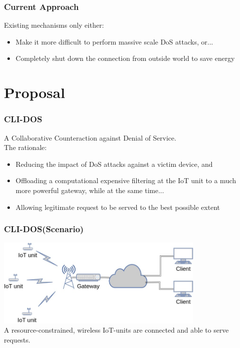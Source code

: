 \documentclass{beamer}
\begin{document}
\begin{frame}
\frametitle{Current Approach}
Existing mechanisms only either:
\begin{itemize}
    \item<1-> Make it more difficult to perform massive scale DoS attacks, or...
    \item<2-> Completely shut down the connection from outside world to save energy
\end{itemize}
\end{frame}


\section{Proposal}

\begin{frame}
\frametitle{CLI-DOS}
A Collaborative Counteraction against Denial of Service. \pause \\
The rationale:
\begin{itemize}
	\item<1-> Reducing the impact of DoS attacks against a victim device, and
	\item<2-> Offloading a computational expensive filtering at the IoT unit to a much more powerful gateway, while at the same time...
	\item<3-> Allowing legitimate request to be served to the best possible extent
\end{itemize}
\end{frame}

\begin{frame}
\frametitle{CLI-DOS(Scenario)}
\includegraphics[height=4.3cm]{gambar/default.jpg}
\\
A resource-constrained, wireless IoT-units are connected and able to serve requests.
\end{frame}
\end{document}
